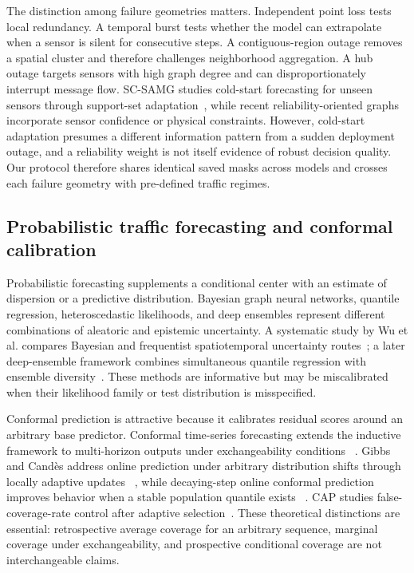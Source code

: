 \documentclass[pdflatex,sn-mathphys-num]{sn-jnl}
\begin{document}
The distinction among failure geometries matters. Independent point loss tests
local redundancy. A temporal burst tests whether the model can extrapolate when
a sensor is silent for consecutive steps. A contiguous-region outage removes a
spatial cluster and therefore challenges neighborhood aggregation. A hub outage
targets sensors with high graph degree and can disproportionately interrupt
message flow. SC-SAMG studies cold-start forecasting for unseen sensors through
support-set adaptation~\cite{wang2026scsamg}, while recent reliability-oriented
graphs incorporate sensor confidence or physical constraints. However,
cold-start adaptation presumes a different information pattern from a sudden
deployment outage, and a reliability weight is not itself evidence of robust
decision quality. Our protocol therefore shares identical saved masks across
models and crosses each failure geometry with pre-defined traffic regimes.

\subsection{Probabilistic traffic forecasting and conformal calibration}
Probabilistic forecasting supplements a conditional center with an estimate of
dispersion or a predictive distribution. Bayesian graph neural networks,
quantile regression, heteroscedastic likelihoods, and deep ensembles represent
different combinations of aleatoric and epistemic uncertainty. A systematic
study by Wu et al. compares Bayesian and frequentist spatiotemporal uncertainty
routes~\cite{wu2021uq}; a later deep-ensemble framework combines simultaneous
quantile regression with ensemble diversity~\cite{liu2024ensembleuq}. These
methods are informative but may be miscalibrated when their likelihood family
or test distribution is misspecified.

Conformal prediction is attractive because it calibrates residual scores around
an arbitrary base predictor. Conformal time-series forecasting extends the
inductive framework to multi-horizon outputs under exchangeability conditions
~\cite{stankeviciute2021conformal}. Gibbs and Cand\`es address online prediction
under arbitrary distribution shifts through locally adaptive updates
~\cite{gibbs2024online}, while decaying-step online conformal prediction
improves behavior when a stable population quantile exists
~\cite{angelopoulos2024online}. CAP studies false-coverage-rate control after
adaptive selection~\cite{bao2025cap}. These theoretical distinctions are
essential: retrospective average coverage for an arbitrary sequence, marginal
coverage under exchangeability, and prospective conditional coverage are not
interchangeable claims.
\end{document}
